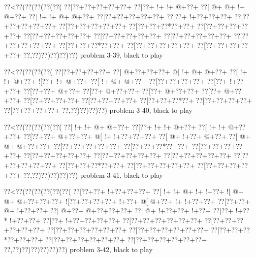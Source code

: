 \vbox{\vbox{\goo
\0??<\0??(\0??(\0??(\0??(\0??(
\0??[\0??+\0??+\0??+\0??+\0??+
\0??[\0??+\- !+\- !+\- @+\0??+
\0??[\- @+\- @+\- !+\- @+\0??+
\0??[\- !+\- !+\- @+\- @+\0??+
\0??[\0??+\0??+\0??+\0??+\0??+
\0??[\0??+\- !+\0??+\0??+\0??+
\0??[\0??+\0??+\0??+\0??+\0??+
\0??[\0??+\0??+\0??+\0??+\0??+
\0??[\0??+\0??+\0??*\0??+\0??+
\0??[\0??+\0??+\0??+\0??+\0??+
\0??[\0??+\0??+\0??+\0??+\0??+
\0??[\0??+\0??+\0??+\0??+\0??+
\0??[\0??+\0??+\0??+\0??+\0??+
\0??[\0??+\0??+\0??+\0??+\0??+
\0??[\0??+\0??+\0??*\0??+\0??+
\0??[\0??+\0??+\0??+\0??+\0??+
\0??[\0??+\0??+\0??+\0??+\0??+
\0??,\0??)\0??)\0??)\0??)\0??)
}
\hfil problem 3-39, black to play\hfil\break
}

\vbox{\vbox{\goo
\0??<\0??(\0??(\0??(\0??(
\0??[\0??+\0??+\0??+\0??+
\0??[\- @+\0??+\0??+\0??+
\- @[\- !+\- @+\- @+\0??+
\0??[\- !+\- !+\- @+\0??+
\- ![\0??+\- !+\- @+\0??+
\0??[\- !+\- @+\- @+\0??+
\0??[\0??+\0??+\0??+\0??+
\0??[\0??+\- !+\0??+\0??+
\0??[\0??+\0??+\- @+\0??+
\0??[\0??+\- @+\0??+\0??+
\0??[\0??+\- @+\0??+\0??+
\0??[\0??+\- @+\0??+\0??+
\0??[\0??+\0??+\0??+\0??+
\0??[\0??+\0??+\0??+\0??+
\0??[\0??+\0??+\0??*\0??+
\0??[\0??+\0??+\0??+\0??+
\0??[\0??+\0??+\0??+\0??+
\0??,\0??)\0??)\0??)\0??)
}
\hfil problem 3-40, black to play\hfil\break
}

\vbox{\vbox{\goo
\0??<\0??(\0??(\0??(\0??(\0??(
\0??[\- !+\- !+\- @+\- @+\0??+
\0??[\0??+\- !+\- !+\- @+\0??+
\0??[\- !+\- !+\- @+\0??+\0??+
\0??[\0??+\0??+\- @+\0??+\0??+
\- @[\- !+\- !+\0??+\0??+\0??+
\0??[\- @+\- !+\0??+\- @+\0??+
\0??[\- @+\- @+\- @+\0??+\0??+
\0??[\0??+\0??+\0??+\0??+\0??+
\0??[\0??+\0??+\0??*\0??+\0??+
\0??[\0??+\0??+\0??+\0??+\0??+
\0??[\0??+\0??+\0??+\0??+\0??+
\0??[\0??+\0??+\0??+\0??+\0??+
\0??[\0??+\0??+\0??+\0??+\0??+
\0??[\0??+\0??+\0??+\0??+\0??+
\0??[\0??+\0??+\0??*\0??+\0??+
\0??[\0??+\0??+\0??+\0??+\0??+
\0??[\0??+\0??+\0??+\0??+\0??+
\0??,\0??)\0??)\0??)\0??)\0??)
}
\hfil problem 3-41, black to play\hfil\break
}

\vbox{\vbox{\goo
\0??<\0??(\0??(\0??(\0??(\0??(\0??(
\0??[\0??+\0??+\- !+\0??+\0??+\0??+
\0??[\- !+\- !+\- @+\- !+\- !+\0??+
\- ![\- @+\- @+\- @+\0??+\0??+\0??+
\- ![\0??+\0??+\0??+\0??+\- !+\0??+
\- @[\- @+\0??+\- !+\- !+\0??+\0??+
\0??[\0??+\0??+\- @+\- !+\0??+\0??+
\0??[\- @+\0??+\- @+\0??+\0??+\0??+
\0??[\- @+\- !+\0??+\0??+\- !+\0??+
\0??[\0??+\- !+\0??*\- !+\0??+\0??+
\0??[\0??+\- !+\0??+\0??+\0??+\0??+
\0??[\0??+\0??+\0??+\0??+\0??+\0??+
\0??[\0??+\0??+\0??+\0??+\0??+\0??+
\0??[\0??+\0??+\0??+\0??+\0??+\0??+
\0??[\0??+\0??+\0??+\0??+\0??+\0??+
\0??[\0??+\0??+\0??*\0??+\0??+\0??+
\0??[\0??+\0??+\0??+\0??+\0??+\0??+
\0??[\0??+\0??+\0??+\0??+\0??+\0??+
\0??,\0??)\0??)\0??)\0??)\0??)\0??)
}
\hfil problem 3-42, black to play\hfil\break
}

